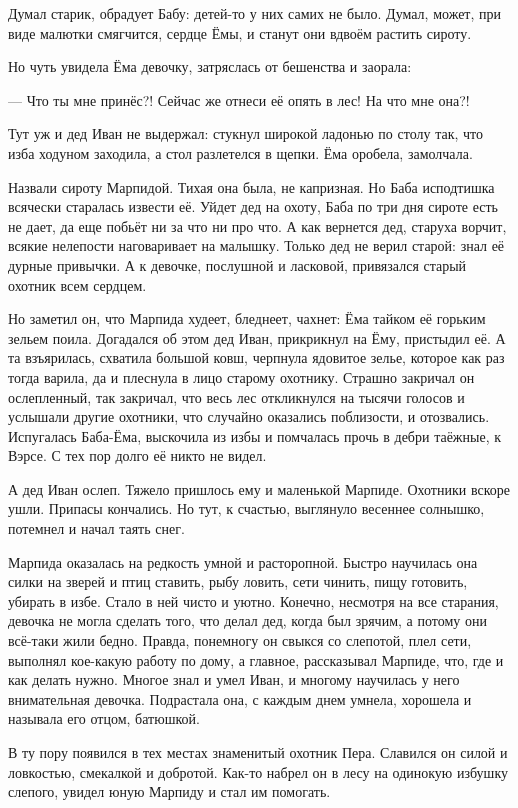 \documentclass[oneside,final,14pt]{extreport}
\begin{document}
	Думал старик, обрадует Бабу: детей-то у них самих не было. Думал, может, при виде малютки смягчится, сердце Ёмы, и станут они вдвоём растить сироту.
	
	Но чуть увидела Ёма девочку, затряслась от бешенства и заорала:
	
	— Что ты мне принёс?! Сейчас же отнеси её опять в лес! На что мне она?!
	
	Тут уж и дед Иван не выдержал: стукнул широкой ладонью по столу так, что изба ходуном заходила, а стол разлетелся в щепки. Ёма оробела, замолчала.
	
	Назвали сироту Марпидой. Тихая она была, не капризная. Но Баба исподтишка всячески старалась извести её. Уйдет дед на охоту, Баба по три дня сироте есть не дает, да еще побьёт ни за что ни про что. А как вернется дед, старуха ворчит, всякие нелепости наговаривает на малышку. Только дед не верил старой: знал её дурные привычки. А к девочке, послушной и ласковой, привязался старый охотник всем сердцем.
	
	Но заметил он, что Марпида худеет, бледнеет, чахнет: Ёма тайком её горьким зельем поила. Догадался об этом дед Иван, прикрикнул на Ёму, пристыдил её. А та взъярилась, схватила большой ковш, черпнула ядовитое зелье, которое как раз тогда варила, да и плеснула в лицо старому охотнику. Страшно закричал он ослепленный, так закричал, что весь лес откликнулся на тысячи голосов и услышали другие охотники, что случайно оказались поблизости, и отозвались. Испугалась Баба-Ёма, выскочила из избы и помчалась прочь в дебри таёжные, к Вэрсе. С тех пор долго её никто не видел.
	
	А дед Иван ослеп. Тяжело пришлось ему и маленькой Марпиде. Охотники вскоре ушли. Припасы кончались. Но тут, к счастью, выглянуло весеннее солнышко, потемнел и начал таять снег.
	
	Марпида оказалась на редкость умной и расторопной. Быстро научилась она силки на зверей и птиц ставить, рыбу ловить, сети чинить, пищу готовить, убирать в избе. Стало в ней чисто и уютно. Конечно, несмотря на все старания, девочка не могла сделать того, что делал дед, когда был зрячим, а потому они всё-таки жили бедно. Правда, понемногу он свыкся со слепотой, плел сети, выполнял кое-какую работу по дому, а главное, рассказывал Марпиде, что, где и как делать нужно. Многое знал и умел Иван, и многому научилась у него внимательная девочка. Подрастала она, с каждым днем умнела, хорошела и называла его отцом, батюшкой.
	
	В ту пору появился в тех местах знаменитый охотник Пера. Славился он силой и ловкостью, смекалкой и добротой. Как-то набрел он в лесу на одинокую избушку слепого, увидел юную Марпиду и стал им помогать.
	
\end{document}

